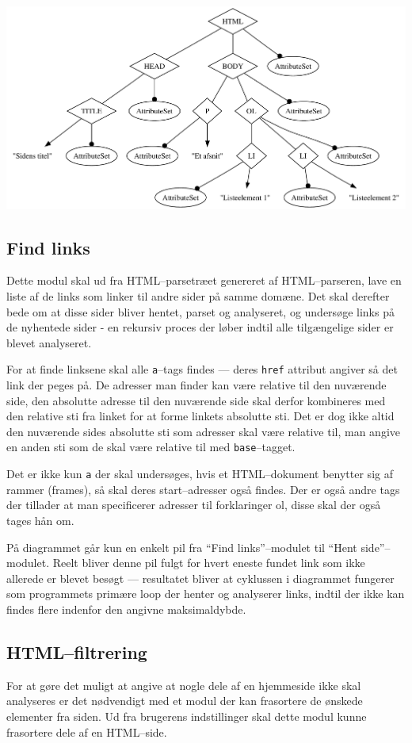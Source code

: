 \documentclass[a4paper,oneside,article]{memoir}
\begin{document}
\includegraphics[width=\textwidth]{parsetree.pdf}


\subsection{Find links}
Dette modul skal ud fra HTML--parsetræet genereret af HTML--parseren,
lave en liste af de links som linker til andre sider på samme domæne.
Det skal derefter bede om at disse sider bliver hentet, parset og
analyseret, og undersøge links på de nyhentede sider - en rekursiv
proces der løber indtil alle tilgængelige sider er blevet analyseret.

For at finde linksene skal alle \texttt{a}--tags findes --- deres
\texttt{href} attribut angiver så det link der peges på. De adresser
man finder kan være relative til den nuværende side, den absolutte
adresse til den nuværende side skal derfor kombineres med den relative
sti fra linket for at forme linkets absolutte sti. Det er dog ikke
altid den nuværende sides absolutte sti som adresser skal være
relative til, man angive en anden sti som de skal være relative til
med \texttt{base}--tagget. 

Det er ikke kun \texttt{a} der skal undersøges, hvis et HTML--dokument
benytter sig af rammer (frames), så skal deres start--adresser også
findes. Der er også andre tags der tillader at man specificerer
adresser til forklaringer ol, disse skal der også tages hån om.

På diagrammet går kun en enkelt pil fra ``Find links''--modulet til
``Hent side''--modulet. Reelt bliver denne pil fulgt for hvert eneste
fundet link som ikke allerede er blevet besøgt --- resultatet bliver at
cyklussen i diagrammet fungerer som programmets primære loop der
henter og analyserer links, indtil der ikke kan findes flere indenfor
den angivne maksimaldybde.

\subsection{HTML--filtrering}
For at gøre det muligt at angive at nogle dele af en hjemmeside ikke
skal analyseres er det nødvendigt med et modul der kan frasortere de
ønskede elementer fra siden. Ud fra brugerens indstillinger skal dette
modul kunne frasortere dele af en HTML--side.
\end{document}
